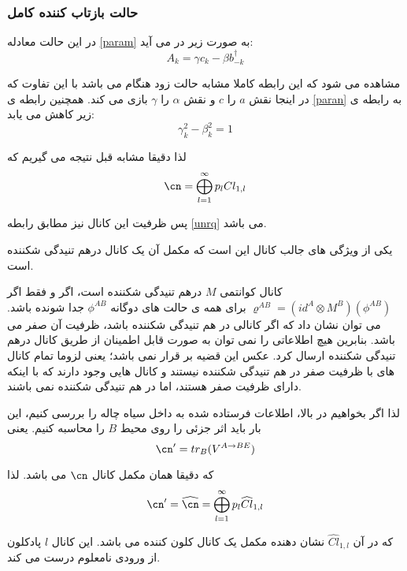 \subsubsection{حالت بازتاب کننده کامل}
در این حالت معادله 
\ref{param}
به صورت زیر در می آید:
\begin{equation}
A_k = \gamma c_k - \beta b_{-k}^\dagger
\end{equation}

مشاهده می شود که این رابطه کاملا مشابه حالت زود هنگام می باشد با این تفاوت که در اینجا نقش
$a$
را
$c$
و نقش
$\alpha$
را
$\gamma$
بازی می کند. همچنین رابطه ی 
\ref{paran}
به رابطه ی زیر کاهش می یابد:
\begin{equation}
\gamma_k^2 - \beta_k ^2  = 1
\end{equation}

لذا دقیقا مشابه قبل نتیجه می گیریم که
\begin{equation}
\cn = \bigoplus_{l=1}^{\infty} p_l Cl_{1,l}
\end{equation} 

پس ظرفیت این کانال 
نیز مطابق رابطه 
\ref{unrq}
می باشد.

یکی از ویژگی های جالب کانال
این است که مکمل آن یک کانال درهم تنیدگی شکننده
 است.
 
  کانال کوانتمی
$M$
درهم تنیدگی شکننده است، اگر و فقط اگر
$\varrho ^{AB} = (id^A \otimes M^B) (\phi^{AB})$
برای همه ی حالت های دوگانه
$\phi^{AB}$
جدا شونده باشد. می توان نشان داد
\cite{qit}
که اگر کانالی در هم تنیدگی شکننده باشد، ظرفیت آن صفر می باشد. بنابرین هیچ اطلاعاتی را نمی توان به صورت قابل اطمینان از طریق کانال درهم تنیدگی شکننده ارسال کرد. عکس این قضیه بر قرار نمی باشد؛ یعنی لزوما تمام کانال های با ظرفیت صفر در هم تنیدگی شکننده نیستند و کانال هایی وجود دارند که با اینکه دارای ظرفیت صفر هستند، اما در هم تنیدگی شکننده نمی باشند.

لذا اگر بخواهیم در بالا، اطلاعات فرستاده شده به داخل سیاه چاله را بررسی کنیم، این بار باید اثر جزئی را روی محیط
$B$
را محاسبه کنیم. یعنی 
\begin{equation}
	\cn ' = tr_B (V^{A \to BE})
\end{equation}

که دقیقا همان مکمل کانال 
$\cn$
می باشد. لذا
\begin{equation}
	\cn ' = \widehat{\cn} = \bigoplus_{l=1}^{\infty} p_l \widehat{Cl}_{1,l}
\end{equation}

که در آن 
$\widehat{Cl}_{1,l}$
نشان دهنده مکمل یک کانال کلون کننده می باشد. این کانال 
$l$
پادکلون از ورودی نامعلوم درست می کند.

